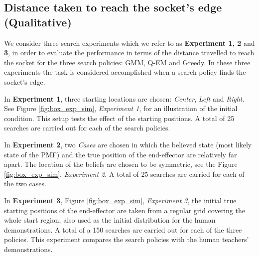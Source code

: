 \documentclass[final,3p,times,twocolumn]{elsarticle}
\begin{document}

\subsection{Distance taken to reach the socket's edge (Qualitative)}

We consider three search experiments which we refer to as \textbf{Experiment 1, 2} and \textbf{3},
in order to evaluate the performance in terms of the distance travelled to reach the socket for the three search policies: GMM, Q-EM and Greedy.
In these three experiments the task is considered accomplished when a search policy finds the socket's edge. 

In \textbf{Experiment 1}, three starting locations are chosen: \textit{Center}, \textit{Left} and \textit{Right}. 
See Figure \ref{fig:box_exp_sim}, \textit{Experiment 1}, for an illustration of the initial condition. 
This setup tests the effect of the starting positions. A total of 25 searches are carried out for each of the search policies.

In \textbf{Experiment 2}, two \textit{Cases} are chosen in which the believed state (most likely state of the PMF) and the true position
of the end-effector are relatively far apart. The location of the beliefs are chosen to be symmetric, see the Figure \ref{fig:box_exp_sim}, 
\textit{Experiment 2}. A total of 25 searches are carried for each of the two cases.

In \textbf{Experiment 3}, Figure \ref{fig:box_exp_sim}, \textit{Experiment 3}, the initial true starting positions 
of the end-effector are taken from a regular grid covering the whole start region, also used as the initial distribution for 
the human demonstrations. A total of a 150 searches are carried out for each of the three policies. 
This experiment compares the search policies with the human teachers' demonstrations.
\end{document}

